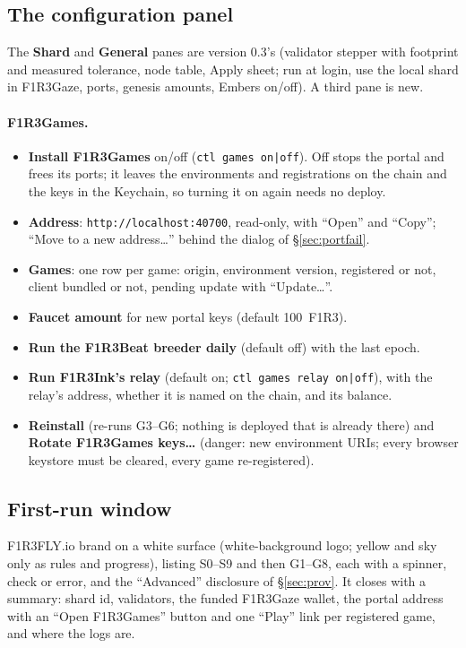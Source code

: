 \documentclass[11pt]{article}
\theoremstyle{definition}
\theoremstyle{remark}
\newcommand{\code}[1]{\texttt{#1}}
\newcommand{\Gz}{F1R3Gaze}
\newcommand{\Gm}{F1R3Games}
\newcommand{\Em}{Embers}
\begin{document}
\subsection{The configuration panel}\label{sec:panel}

The \textbf{Shard} and \textbf{General} panes are version 0.3's (validator stepper
with footprint and measured tolerance, node table, Apply sheet; run at login, use the
local shard in \Gz{}, ports, genesis amounts, \Em{} on/off). A third pane is new.

\paragraph{\Gm{}.}
\begin{itemize}[nosep]
\item \textbf{Install \Gm{}} on/off (\code{ctl games on|off}). Off stops the portal
  and frees its ports; it leaves the environments and registrations on the chain and
  the keys in the Keychain, so turning it on again needs no deploy.
\item \textbf{Address}: \code{http://localhost:40700}, read-only, with ``Open'' and
  ``Copy''; ``Move to a new address\ldots'' behind the dialog of \S\ref{sec:portfail}.
\item \textbf{Games}: one row per game: origin, environment version, registered or
  not, client bundled or not, pending update with ``Update\ldots''.
\item \textbf{Faucet amount} for new portal keys (default 100~F1R3).
\item \textbf{Run the F1R3Beat breeder daily} (default off) with the last epoch.
\item \textbf{Run F1R3Ink's relay} (default on; \code{ctl games relay on|off}), with
  the relay's address, whether it is named on the chain, and its balance.
\item \textbf{Reinstall} (re-runs G3--G6; nothing is deployed that is already there)
  and \textbf{Rotate \Gm{} keys\ldots} (danger: new environment URIs; every browser
  keystore must be cleared, every game re-registered).
\end{itemize}

\subsection{First-run window}
F1R3FLY.io brand on a white surface (white-background logo; yellow and sky only as
rules and progress), listing S0--S9 and then G1--G8, each with a spinner, check or
error, and the ``Advanced'' disclosure of \S\ref{sec:prov}. It closes with a summary:
shard id, validators, the funded \Gz{} wallet, the portal address with an
``Open \Gm{}'' button and one ``Play'' link per registered game, and where the logs
are.
\end{document}
